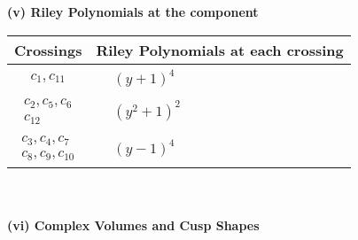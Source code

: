 \documentclass[1p]{elsarticle_modified}
\theoremstyle{definition}
\begin{document}
\newpage\renewcommand{\arraystretch}{1}
\flushleft \textbf{(v) Riley Polynomials at the component}\newline \\
\begin{tabular}{m{50pt}|m{274pt}}
Crossings & \hspace{64pt}Riley Polynomials at each crossing \\
\hline $$\begin{aligned}c_{1},c_{11}\end{aligned}$$&$\begin{aligned}
&(y+1)^4
\end{aligned}$\\
\hline $$\begin{aligned}c_{2},c_{5},c_{6}\\c_{12}\end{aligned}$$&$\begin{aligned}
&(y^2+1)^2
\end{aligned}$\\
\hline $$\begin{aligned}c_{3},c_{4},c_{7}\\c_{8},c_{9},c_{10}\end{aligned}$$&$\begin{aligned}
&(y-1)^4
\end{aligned}$\\
\hline
\end{tabular}\\~\\
\newpage\flushleft \textbf{(vi) Complex Volumes and Cusp Shapes}
\end{document}

